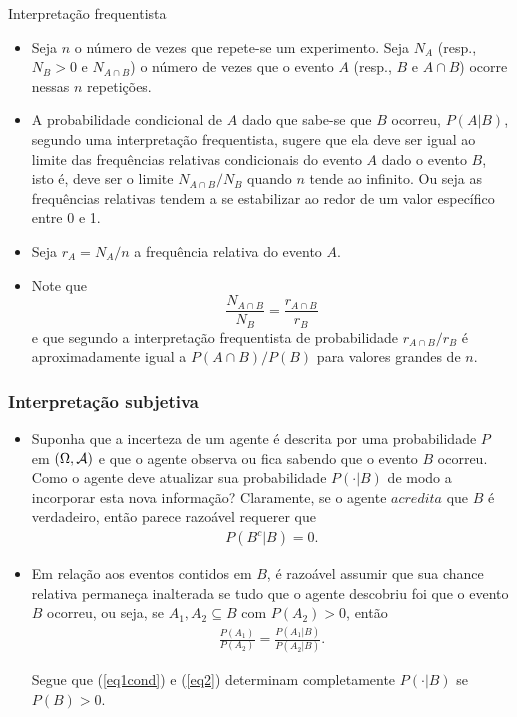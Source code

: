 \begin{frame}{Interpretação frequentista}
	\begin{itemize}
	
\item 	Seja $n$ o número de vezes que repete-se um experimento. Seja $N_A$ (resp., $N_B>0$ e
	$N_{A\cap B}$) o número de vezes que o
	evento $A$ (resp., $B$ e $A\cap B$) ocorre nessas $n$ repetições. 
	
	\item A probabilidade
	condicional  de $A$ dado que sabe-se que $B$ ocorreu, $P(A|B)$, segundo uma
	interpretação frequentista, sugere que ela deve ser igual ao limite
	das frequências relativas condicionais do evento $A$ dado o evento
	$B$, isto é, deve ser o limite $N_{A\cap B}/N_B$ quando
	$n$ tende ao infinito. Ou seja  as frequências relativas tendem a se estabilizar  ao redor de um valor específico entre 0 e 1.
	
	\item Seja $r_A=N_A/n$ a frequência relativa do
	evento $A$. 
	
	\item Note que $$\frac{N_{A\cap B}}{N_B}=\frac{r_{A\cap B}}{r_B}$$ e que segundo a interpretação
	frequentista de probabilidade $r_{A\cap B}/r_B$ é aproximadamente igual a $P(A\cap
	B)/P(B)$ para valores grandes de $n$.
	\end{itemize}
\end{frame}



\begin{frame}
\frametitle{Interpretação subjetiva}
	\begin{itemize}
\item 	Suponha que a
	incerteza de um agente é descrita por uma probabilidade $P$ em
	$(\Omega,{\cal A})$ e que o agente observa ou fica sabendo que o evento
	$B$ ocorreu. Como o agente deve atualizar sua probabilidade
	$P(\cdot|B)$ de modo a incorporar esta nova informação? Claramente,
	se o agente $acredita$ que $B$ é verdadeiro, então parece razoável
	requerer que
	\begin{eqnarray}
	\label{eq1cond} P(B^c|B)=0.
	\end{eqnarray}
	
\item 	Em relação aos eventos contidos em $B$, é razoável assumir que sua
	chance relativa permaneça inalterada se tudo que o agente descobriu
	foi que o evento $B$ ocorreu, ou seja, se $A_1,A_2\subseteq B$ com
	$P(A_2)>0$, então
	\begin{eqnarray}
	\label{eq2} \frac{P(A_1)}{P(A_2)}=\frac{P(A_1|B)}{P(A_2|B)}.
	\end{eqnarray}
	
	Segue que (\ref{eq1cond}) e (\ref{eq2}) determinam completamente
	$P(\cdot|B)$ se $P(B)>0$.
	\end{itemize}
\end{frame}



